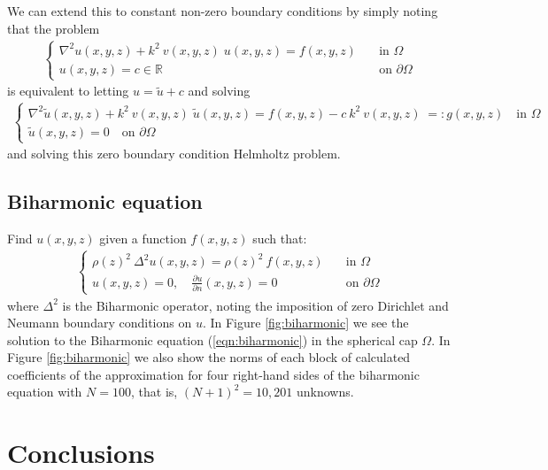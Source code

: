 \documentclass[11pt, oneside]{article}   	%
\newcommand{\bstodo}{\todo[color=pink]}
\newcommand{\R}{\mathbb{R}}
\begin{document}

We can extend this to constant non-zero boundary conditions by simply noting that the problem 
\begin{align*}
	\begin{cases}
    		\nabla^2 u(x,y,z) + k^2 \: v(x,y,z) \; u(x,y,z) = f(x,y,z) &\quad \text{in } \Omega \\
		u(x,y,z) = c \in \R &\quad \text{on } \partial \Omega
	\end{cases}
\end{align*}
is equivalent to letting $u = \tilde{u} + c$ and solving
\begin{align*}
	\begin{cases}
    		\nabla^2 \tilde{u}(x,y,z) + k^2 \: v(x,y,z) \; \tilde{u}(x,y,z) = f(x,y,z) - c \: k^2 \: v(x,y,z) \; =: g(x,y,z)  \quad \text{in } \Omega \\
		\tilde{u}(x,y,z) = 0 \quad \text{on } \partial \Omega
	\end{cases}
\end{align*}
and solving this zero boundary condition Helmholtz problem.


\subsection{Biharmonic equation}

Find $u(x,y,z)$ given a function $f(x,y,z)$ such that:
\begin{align}
	\begin{cases}
    		\rho(z)^2 \: \Delta^2 u(x,y,z) = \rho(z)^2 \: f(x,y,z) &\quad \text{in } \Omega \\
		u(x,y,z) = 0, \quad \frac{\partial u}{\partial n}(x,y,z) = 0 &\quad \text{on } \partial \Omega
	\end{cases}
	\label{eqn:biharmonic}
\end{align}
where $\Delta^2$ is the Biharmonic operator, noting the imposition of zero Dirichlet and Neumann boundary conditions on $u$. In Figure \ref{fig:biharmonic} we see the solution to the Biharmonic equation (\ref{eqn:biharmonic}) in the spherical cap $\Omega$. In Figure \ref{fig:biharmonic} we also show the norms of each block of calculated coefficients of the approximation for four right-hand sides of the biharmonic equation with $N = 100$, that is, $(N+1)^2 = 10,201$ unknowns.  \bstodo{Add to the comments here}



%
\section{Conclusions}
\end{document}
